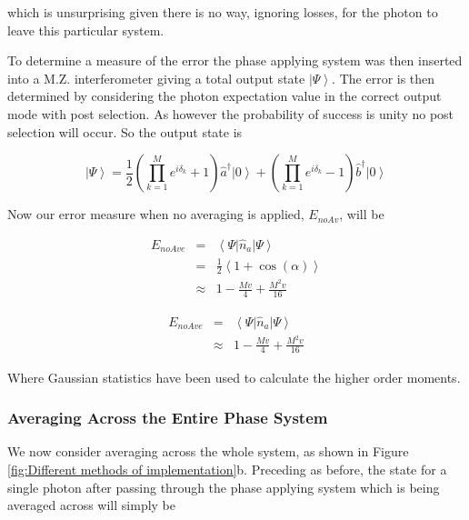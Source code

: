 \documentclass[aps,pra,twocolumn,superscriptaddress,numerical]{revtex4-1}
\begin{document}
		
		which is unsurprising given there is no way, ignoring losses, for the photon to leave this particular system.
		
		To determine a measure of the error the phase applying system was then inserted into a M.Z. interferometer giving a total output state $\left|\Psi\right\rangle $. The error is then determined by considering the photon expectation value in the correct output mode with post selection. As however the probability of success is unity no post selection will occur. So the output state is
		
		\begin{equation}
		\left|\Psi\right\rangle 	=\frac{1}{2}\left(\prod_{k=1}^{M}e^{i\delta_{k}}+1\right)\hat{a}^{\dagger}\left|0\right\rangle +\left(\prod_{k=1}^{M}e^{i\delta_{k}}-1\right)\hat{b}^{\dagger}\left|0\right\rangle \label{eq:noAveIntState}
		\end{equation}
		
		
		Now our error measure when no averaging is applied, $E_{noAv}$, will be
		
		\begin{eqnarray}
		E_{noAve} & = & \left\langle \Psi\right|\hat{n}_{a}\left|\Psi\right\rangle \nonumber \\
		& = & \frac{1}{2}\left\langle 1+\cos\left(\alpha\right)\right\rangle \nonumber \\
		& \approx & 1-\frac{Mv}{4}+\frac{M^{2}v}{16}\label{eq:ErrorNoAv1}
		\end{eqnarray}
		
		
		\begin{eqnarray}
		E_{noAve} & = & \left\langle \Psi\right|\hat{n}_{a}\left|\Psi\right\rangle \nonumber \\
		& \approx & 1-\frac{Mv}{4}+\frac{M^{2}v}{16}\label{eq:ErrorNoAv}
		\end{eqnarray}
		
		Where Gaussian statistics have been used to calculate the higher order moments.
		
		
		\subsubsection{Averaging Across the Entire Phase System\label{Averaging Across the Entire Phase System}}
		
		We now consider averaging across the whole system, as shown in Figure  \ref{fig:Different methods of implementation}b. Preceding as before, the state for a single photon after passing through the phase applying system which is being averaged across will simply be
		
\end{document}
